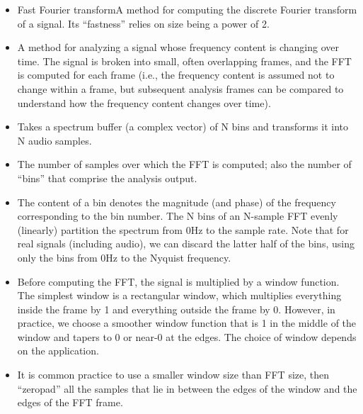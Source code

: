 \documentclass[letterpaper,10pt,english]{sphinxmanual}
\begin{document}
\label{\detokenize{AudioBasics:fft-stft-cheat-sheet}}\label{\detokenize{AudioBasics:fft-stft-cheat-sheet}}\begin{itemize}
\item {} 
 Fast Fourier transformA method for computing the discrete Fourier transform of a signal. Its “fastness”
relies on size being a power of 2.

\item {} 
A method for analyzing a signal whose frequency content is changing over time.
The signal is broken into small, often overlapping frames, and the FFT is computed for
each frame (i.e., the frequency content is assumed not to change within a frame, but
subsequent analysis frames can be compared to understand how the frequency content
changes over time).

\item {} 
Takes a spectrum buffer (a complex vector) of N bins and transforms it into N
audio samples.

\item {} 
The number of samples over which the FFT is computed; also the number of
“bins” that comprise the analysis output.

\item {} 
The content of a bin denotes the magnitude (and phase) of the frequency
corresponding to the bin number. The N bins of an N-sample FFT evenly (linearly)
partition the spectrum from 0Hz to the sample rate. Note that for real signals (including
audio), we can discard the latter half of the bins, using only the bins from 0Hz to the
Nyquist frequency.

\item {} 
Before computing the FFT, the signal is multiplied by a window function. The
simplest window is a rectangular window, which multiplies everything inside the frame
by 1 and everything outside the frame by 0. However, in practice, we choose a smoother
window function that is 1 in the middle of the window and tapers to 0 or near-0 at the
edges. The choice of window depends on the application.

\item {} 
It is common practice to use a smaller window size than FFT size, then “zeropad”
all the samples that lie in between the edges of the window and the edges of the FFT
frame.


\end{itemize}
\end{document}

